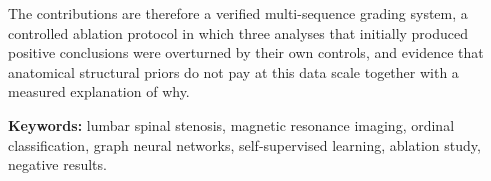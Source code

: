 The contributions are therefore a verified multi-sequence grading system, a
controlled ablation protocol in which three analyses that initially produced
positive conclusions were overturned by their own controls, and evidence that
anatomical structural priors do not pay at this data scale together with a
measured explanation of why.

\vspace{0.5em}
\noindent\textbf{Keywords:} lumbar spinal stenosis, magnetic resonance imaging,
ordinal classification, graph neural networks, self-supervised learning,
ablation study, negative results.

\tableofcontents

\cleardoublepage
{}








%

\cleardoublepage
\let\printbibliography\thesisrealbibliography
\printbibliography[heading=bibintoc,title={References}]


